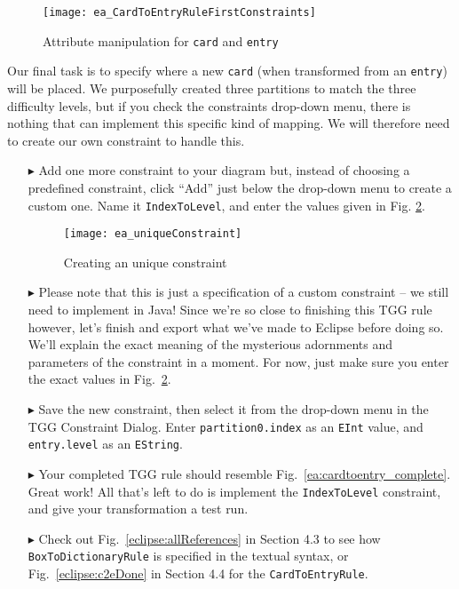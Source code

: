 \begin{figure}[htbp]
\begin{center}
  \texttt{[image: ea\_CardToEntryRuleFirstConstraints]}
  \caption{Attribute manipulation for \texttt{card} and \texttt{entry}}
  \label{ea:cardtoentry_2}
\end{center}
\end{figure}
\FloatBarrier

Our final task is to specify where a new \texttt{card} (when transformed from an \texttt{entry}) will be placed.  We purposefully created three
partitions to match the three difficulty levels, but if you check the constraints drop-down menu, there is nothing that can implement this specific kind of
mapping. We will therefore need to create our own constraint to handle this.

\begin{enumerate}

\item[$\blacktriangleright$] Add one more constraint to your diagram but, instead of choosing a predefined constraint, click ``Add'' just below the
drop-down menu to create a custom one. Name it \texttt{IndexToLevel}, and enter the values given in Fig. \ref{ea:create_new_constraint}.

\begin{figure}[htbp]
\begin{center}
  \texttt{[image: ea\_uniqueConstraint]}
  \caption{Creating an unique constraint}
  \label{ea:create_new_constraint}
\end{center}
\end{figure}
\FloatBarrier

\item[$\blacktriangleright$] Please note that this is just a specification of a custom constraint -- we still need to implement in Java! Since we're so close to
finishing this TGG rule however, let's finish and export what we've made to Eclipse before doing so. We'll explain the exact meaning of the mysterious
adornments and parameters of the constraint in a moment. For now, just make sure you enter the exact values in Fig.~\ref{ea:create_new_constraint}. 

\item[$\blacktriangleright$] Save the new constraint, then select it from the drop-down menu in the TGG Constraint Dialog. Enter \texttt{partition0.index} as an
\texttt{EInt} value, and \texttt{entry.level} as an \texttt{EString}.

\item[$\blacktriangleright$] Your completed TGG rule should resemble Fig.~\ref{ea:cardtoentry_complete}. Great work! All that's left to do is implement the
\texttt{IndexToLevel} constraint, and give your transformation a test run.

\item[$\blacktriangleright$] Check out Fig.~\ref{eclipse:allReferences} in Section 4.3 to see how \texttt{BoxToDictionaryRule} is specified in the textual
syntax, or Fig.~\ref{eclipse:c2eDone} in Section 4.4 for the \texttt{CardToEntryRule}.

\end{enumerate}

